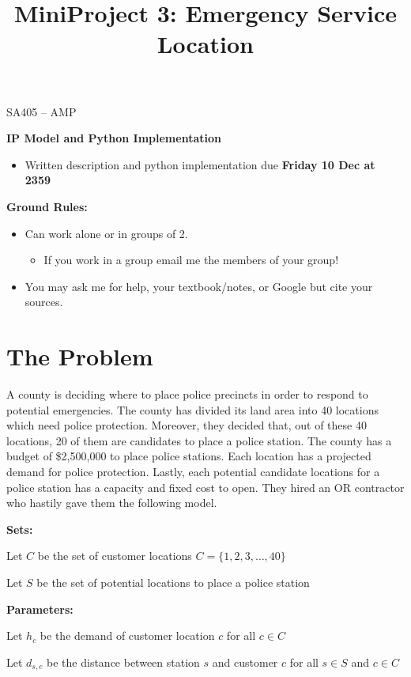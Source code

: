 \documentclass[11pt]{article}
\makeatletter
\newcommand{\blu}{\color{blue}}
\theoremstyle{definition}
\renewcommand{\maketitle}{
  \noindent SA405 -- AMP \hfill \\

  \begin{center}\Large{\textbf{\@title}}\end{center}
}
\makeatother
\begin{document}
  
\title{MiniProject 3:  Emergency Service Location}

\maketitle

{\blu \Large \textbf{IP Model and Python Implementation}}
	\begin{itemize}
	\item Written description and python implementation due \textbf{Friday 10 Dec at 2359}
	\end{itemize}

{\blu \Large \bf Ground Rules:}
	\begin{itemize}
	\item Can work alone or in groups of 2.
		\begin{itemize}
		\item If you work in a group email me the members of your group!
		\end{itemize}
	\item You may ask me for help, your textbook/notes, or Google but cite your sources.
	\end{itemize}

\section{The Problem}

A county is deciding where to place police precincts in order to respond to potential emergencies. The county has divided its land area into 40 locations which need police protection. Moreover, they decided that, out of these 40 locations, 20 of them are candidates to place a police station. The county has a budget of \$2,500,000 to place police stations. Each location has a projected demand for police protection. Lastly, each potential candidate locations for a police station has a capacity and fixed cost to open. They hired an OR contractor who hastily gave them the following model.

\textbf{Sets:}

Let $C$ be the set of customer locations $C = \{1,2,3,\hdots, 40\}$

Let $S$ be the set of potential locations to place a police station

\textbf{Parameters:}

Let $h_c$ be the demand of customer location $c$ for all $c \in C$

Let $d_{s,c}$ be the distance between station $s$ and customer $c$ for all $s \in S$ and $c \in C$
\end{document}

